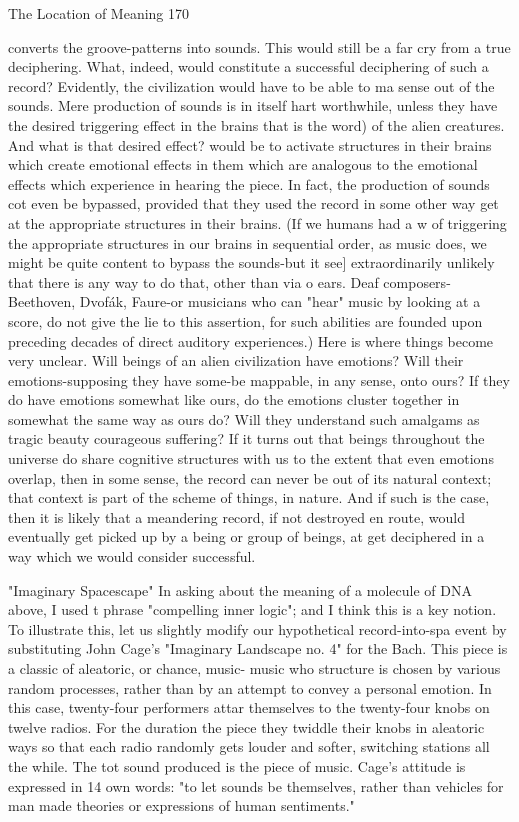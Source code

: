 The Location of Meaning                                                                    170

converts the groove-patterns into sounds. This would still be a far cry from a true
deciphering. What, indeed, would constitute a successful deciphering of such a record?
Evidently, the civilization would have to be able to ma sense out of the sounds. Mere
production of sounds is in itself hart worthwhile, unless they have the desired triggering
effect in the brains that is the word) of the alien creatures. And what is that desired
effect? would be to activate structures in their brains which create emotional effects in
them which are analogous to the emotional effects which experience in hearing the piece.
In fact, the production of sounds cot even be bypassed, provided that they used the record
in some other way get at the appropriate structures in their brains. (If we humans had a w
of triggering the appropriate structures in our brains in sequential order, as music does,
we might be quite content to bypass the sounds-but it see] extraordinarily unlikely that
there is any way to do that, other than via o ears. Deaf composers-Beethoven, Dvofák,
Faure-or musicians who can "hear" music by looking at a score, do not give the lie to this
assertion, for such abilities are founded upon preceding decades of direct auditory
experiences.)
         Here is where things become very unclear. Will beings of an alien civilization
have emotions? Will their emotions-supposing they have some-be mappable, in any
sense, onto ours? If they do have emotions somewhat like ours, do the emotions cluster
together in somewhat the same way as ours do? Will they understand such amalgams as
tragic beauty courageous suffering? If it turns out that beings throughout the universe do
share cognitive structures with us to the extent that even emotions overlap, then in some
sense, the record can never be out of its natural context; that context is part of the scheme
of things, in nature. And if such is the case, then it is likely that a meandering record, if
not destroyed en route, would eventually get picked up by a being or group of beings, at
get deciphered in a way which we would consider successful.


                               "Imaginary Spacescape"
        In asking about the meaning of a molecule of DNA above, I used t phrase
"compelling inner logic"; and I think this is a key notion. To illustrate this, let us slightly
modify our hypothetical record-into-spa event by substituting John Cage's "Imaginary
Landscape no. 4" for the Bach. This piece is a classic of aleatoric, or chance, music-
music who structure is chosen by various random processes, rather than by an attempt to
convey a personal emotion. In this case, twenty-four performers attar themselves to the
twenty-four knobs on twelve radios. For the duration the piece they twiddle their knobs in
aleatoric ways so that each radio randomly gets louder and softer, switching stations all
the while. The tot sound produced is the piece of music. Cage's attitude is expressed in 14
own words: "to let sounds be themselves, rather than vehicles for man made theories or
expressions of human sentiments."




